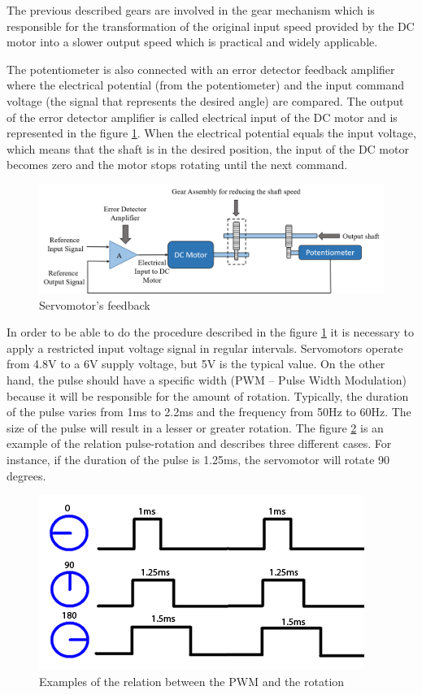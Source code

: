 The previous described gears are involved in the gear mechanism which is responsible for the transformation of the original input speed provided by the DC motor into a slower output speed which is practical and widely applicable. 

The potentiometer is also connected with an error detector feedback amplifier where the electrical potential (from the potentiometer) and the input command voltage (the signal that represents the desired angle) are compared. The output of the error detector amplifier is called electrical input of the DC motor and is represented in the figure \ref{servomotor_expl3}. When the electrical potential equals the input voltage, which means that the shaft is in the desired position, the input of the DC motor becomes zero and the motor stops rotating until the next command.

\begin{figure}[H]
\centering
\includegraphics[scale=0.6]{figures/servomotor_expl3new.png}
\caption{Servomotor’s feedback}
\label{servomotor_expl3}
\end{figure}

In order to be able to do the procedure described in the figure \ref{servomotor_expl3} it is necessary to apply a restricted input voltage signal in regular intervals. Servomotors operate from 4.8V to a 6V supply voltage, but 5V is the typical value. On the other hand, the pulse should have a specific width (PWM – Pulse Width Modulation) because it will be responsible for the amount of rotation. Typically, the duration of the pulse varies from 1ms to 2.2ms and the frequency from 50Hz to 60Hz. The size of the pulse will result in a lesser or greater rotation. The figure \ref{signal_servo} is an example of the relation pulse-rotation and describes three different cases. For instance, if the duration of the pulse is 1.25ms, the servomotor will rotate 90 degrees.

\begin{figure}[H]
\centering
\includegraphics[scale=0.5]{figures/signal_servo.jpg}
\caption{Examples of the relation between the PWM and the rotation}
\label{signal_servo}
\end{figure}

